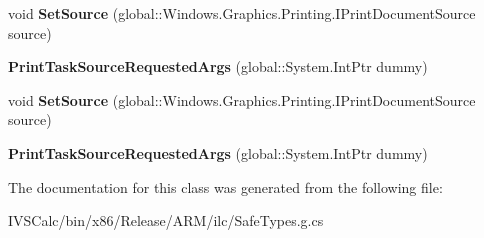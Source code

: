\begin{DoxyCompactItemize}
\item 
\mbox{\label{class_windows_1_1_graphics_1_1_printing_1_1_print_task_source_requested_args_a39d48374b2d0a2be332c4bf408f2aa57}} 
void {\bfseries Set\+Source} (global\+::\+Windows.\+Graphics.\+Printing.\+I\+Print\+Document\+Source source)
\item 
\mbox{\label{class_windows_1_1_graphics_1_1_printing_1_1_print_task_source_requested_args_a3871e33358823f2a5dd03986bc74c18b}} 
{\bfseries Print\+Task\+Source\+Requested\+Args} (global\+::\+System.\+Int\+Ptr dummy)
\item 
\mbox{\label{class_windows_1_1_graphics_1_1_printing_1_1_print_task_source_requested_args_a39d48374b2d0a2be332c4bf408f2aa57}} 
void {\bfseries Set\+Source} (global\+::\+Windows.\+Graphics.\+Printing.\+I\+Print\+Document\+Source source)
\item 
\mbox{\label{class_windows_1_1_graphics_1_1_printing_1_1_print_task_source_requested_args_a3871e33358823f2a5dd03986bc74c18b}} 
{\bfseries Print\+Task\+Source\+Requested\+Args} (global\+::\+System.\+Int\+Ptr dummy)
\end{DoxyCompactItemize}


The documentation for this class was generated from the following file\+:\begin{DoxyCompactItemize}
\item 
I\+V\+S\+Calc/bin/x86/\+Release/\+A\+R\+M/ilc/Safe\+Types.\+g.\+cs\end{DoxyCompactItemize}
